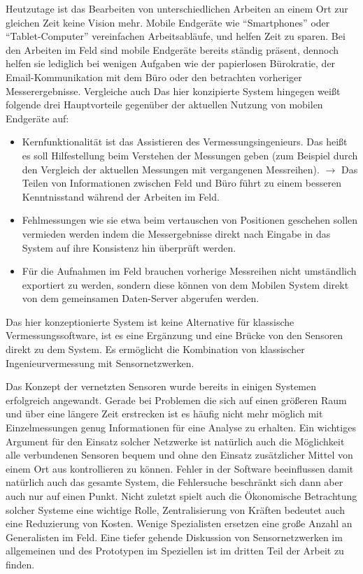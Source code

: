 Heutzutage ist das Bearbeiten von unterschiedlichen Arbeiten an einem Ort zur gleichen Zeit keine Vision mehr. Mobile Endgeräte wie ``Smartphones'' oder ``Tablet-Computer'' vereinfachen Arbeitsabläufe, und helfen Zeit zu sparen. Bei den Arbeiten im Feld sind mobile Endgeräte bereits ständig präsent, dennoch helfen sie lediglich bei wenigen Aufgaben wie der papierlosen Bürokratie, der Email-Kommunikation mit dem Büro oder den betrachten vorheriger Messerergebnisse. Vergleiche auch \citep{breunig_entwicklung_2003} \citep{breunig_vision_2003} Das hier konzipierte System hingegen weißt folgende drei Hauptvorteile gegenüber der aktuellen Nutzung von mobilen Endgeräte auf:
\begin{itemize}
\item Kernfunktionalität ist das Assistieren des Vermessungsingenieurs. Das heißt es soll Hilfestellung beim Verstehen der Messungen geben (zum Beispiel durch den Vergleich der aktuellen Messungen mit vergangenen Messreihen). $\rightarrow$ Das Teilen von Informationen zwischen Feld und Büro führt zu einem besseren Kenntnisstand während der Arbeiten im Feld.
\item Fehlmessungen wie sie etwa beim vertauschen von Positionen geschehen sollen vermieden werden indem die Messergebnisse direkt nach Eingabe in das System auf ihre Konsistenz hin überprüft werden.
\item Für die Aufnahmen im Feld brauchen vorherige Messreihen nicht umständlich exportiert zu werden, sondern diese können von dem Mobilen System direkt von dem gemeinsamen Daten-Server abgerufen werden.
\end{itemize}
Das hier konzeptionierte System ist keine Alternative für klassische Vermessungssoftware, ist es eine Ergänzung und eine Brücke von den Sensoren direkt zu dem System. Es ermöglicht die Kombination von klassischer Ingenieurvermessung mit Sensornetzwerken.

Das Konzept der vernetzten Sensoren wurde bereits in einigen Systemen erfolgreich angewandt. Gerade bei Problemen die sich auf einen größeren Raum und über eine längere Zeit erstrecken ist es häufig nicht mehr möglich mit Einzelmessungen genug Informationen für eine Analyse zu erhalten. Ein wichtiges Argument für den Einsatz solcher Netzwerke ist natürlich auch die Möglichkeit alle verbundenen Sensoren bequem und ohne den Einsatz zusätzlicher Mittel von einem Ort aus kontrollieren zu können. Fehler in der Software beeinflussen damit natürlich auch das gesamte System, die Fehlersuche beschränkt sich dann aber auch nur auf einen Punkt. Nicht zuletzt spielt auch die Ökonomische Betrachtung solcher Systeme eine wichtige Rolle, Zentralisierung von Kräften bedeutet auch eine Reduzierung von Kosten. Wenige Spezialisten ersetzen eine große Anzahl an Generalisten im Feld. Eine tiefer gehende Diskussion von Sensornetzwerken im allgemeinen und des Prototypen im Speziellen ist im dritten Teil der Arbeit zu finden.


